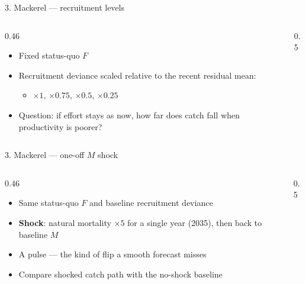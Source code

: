 \documentclass[12pt,aspectratio=169]{beamer}
\begin{document}
\begin{frame}{3. Mackerel --- recruitment levels}
  \begin{columns}[T]
    \begin{column}{0.46\textwidth}
      \begin{itemize}
        \item Fixed status-quo $F$
        \item Recruitment deviance scaled relative to the recent residual mean:
          \begin{itemize}
            \item $\times 1$, $\times 0.75$, $\times 0.5$, $\times 0.25$
          \end{itemize}
        \item Question: if effort stays as now, how far does catch fall when productivity is poorer?
      \end{itemize}
    \end{column}
    \begin{column}{0.5\textwidth}
      \centering
      \\
    \end{column}
  \end{columns}
\end{frame}

\begin{frame}{3. Mackerel --- one-off $M$ shock}
  \begin{columns}[T]
    \begin{column}{0.46\textwidth}
      \begin{itemize}
        \item Same status-quo $F$ and baseline recruitment deviance
        \item \textbf{Shock}: natural mortality $\times 5$ for a single year (2035), then back to baseline $M$
        \item A pulse --- the kind of flip a smooth forecast misses
        \item Compare shocked catch path with the no-shock baseline
      \end{itemize}
    \end{column}
    \begin{column}{0.5\textwidth}
      \centering
      \\
    \end{column}
  \end{columns}
\end{frame}
\end{document}
